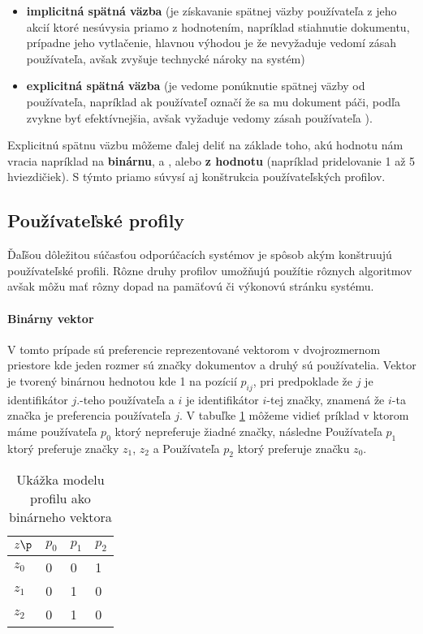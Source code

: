 \begin{itemize}
\item{\textbf{implicitná spätná väzba} (je získavanie spätnej väzby používateľa z jeho akcií
ktoré nesúvysia priamo z hodnotením, napríklad stiahnutie dokumentu, prípadne jeho vytlačenie, 
hlavnou výhodou je že nevyžaduje vedomí zásah používateľa, avšak zvyšuje technycké nároky na 
systém) }
\item{\textbf{explicitná spätná väzba} (je vedome ponúknutie spätnej väzby od používateľa,
napríklad ak používateľ označí že sa mu dokument páči, podľa \cite{basic_user_profiles}
zvykne byť efektívnejšia, avšak vyžaduje vedomy zásah používateľa )}.
\end{itemize}

Explicitnú spätnu väzbu môžeme ďalej deliť na základe toho, akú hodnotu nám vracia napríklad 
na \textbf{binárnu},  a , alebo \textbf{z hodnotu} (napríklad
pridelovanie 1 až 5 hviezdičiek). S týmto priamo súvysí aj konštrukcia používateľských profilov.

\subsection{Používateľské profily}

Ďaľšou dôležitou súčasťou odporúčacích systémov je spôsob akým konštruujú používateľské profili.
Rôzne druhy profilov umožňujú použítie rôznych algoritmov avšak môžu mať rôzny dopad na 
pamäťovú či výkonovú stránku systému\cite{basic_user_profiles}.

\paragraph{Binárny vektor}

V tomto prípade sú preferencie reprezentované vektorom v dvojrozmernom priestore kde
jeden rozmer sú značky dokumentov a druhý sú používatelia. Vektor
je tvorený binárnou hednotou kde 1 na pozícií \(p_{ij}\), pri predpoklade že \(j\) je 
identifikátor \(j\).-teho používateľa a \(i\) je identifikátor \(i\)-tej značky,
znamená že \(i\)-ta značka je preferencia používateľa \(j\).
V tabuľke \ref{table:binaryprofile} môžeme vidieť príklad v ktorom máme používateľa \(p_0\)
ktorý nepreferuje žiadné značky, následne Používateľa \(p_1\) ktorý preferuje značky \(z_1\),
\(z_2\)
a Používateľa \(p_2\) ktorý preferuje značku \(z_0\).

\begin{table}[h]
\begin{center}
\begin{tabular}{|l|l|l|l|}
\hline
\(z\p\)  & \(p_0\) & \(p_1\) & \(p_2\) \\ \hline
\(z_0\) & 0     & 0        & 1        \\ \hline
\(z_1\) & 0     & 1        & 0        \\ \hline
\(z_2\) & 0     & 1        & 0        \\ \hline
\end{tabular}
\end{center}
\caption{Ukážka modelu profilu ako binárneho vektora}
\label{table:binaryprofile}
\end{table}

